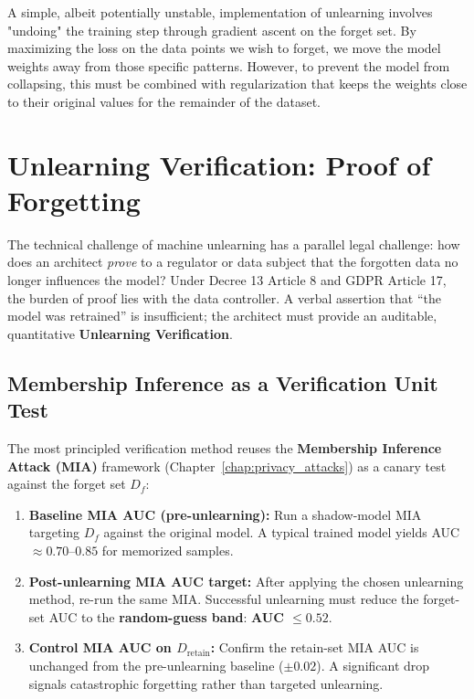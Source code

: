 A simple, albeit potentially unstable, implementation of unlearning involves "undoing" the training step through gradient ascent on the forget set. By maximizing the loss on the data points we wish to forget, we move the model weights away from those specific patterns. However, to prevent the model from collapsing, this must be combined with regularization that keeps the weights close to their original values for the remainder of the dataset.

\section{Unlearning Verification: Proof of Forgetting}
\label{sec:unlearning_verification}

The technical challenge of machine unlearning has a parallel legal challenge: how does an architect \emph{prove} to a regulator or data subject that the forgotten data no longer influences the model? Under Decree 13 Article 8 and GDPR Article 17, the burden of proof lies with the data controller. A verbal assertion that ``the model was retrained'' is insufficient; the architect must provide an auditable, quantitative \textbf{Unlearning Verification}.

\subsection{Membership Inference as a Verification Unit Test}
\label{subsec:mia_verification}

The most principled verification method reuses the \textbf{Membership Inference Attack (MIA)} framework (Chapter~\ref{chap:privacy_attacks}) as a canary test against the forget set $D_f$:

\begin{enumerate}
  \item \textbf{Baseline MIA AUC (pre-unlearning):} Run a shadow-model MIA targeting $D_f$ against the original model. A typical trained model yields AUC $\approx 0.70$--$0.85$ for memorized samples.
  \item \textbf{Post-unlearning MIA AUC target:} After applying the chosen unlearning method, re-run the same MIA. Successful unlearning must reduce the forget-set AUC to the \textbf{random-guess band}: \textbf{AUC $\leq 0.52$}.
  \item \textbf{Control MIA AUC on $D_{\mathrm{retain}}$:} Confirm the retain-set MIA AUC is unchanged from the pre-unlearning baseline ($\pm 0.02$). A significant drop signals catastrophic forgetting rather than targeted unlearning.
\end{enumerate}

